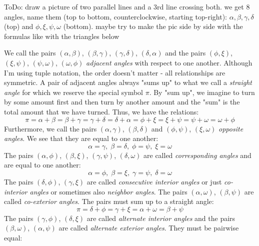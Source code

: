 \medskip
ToDo: draw a picture of two parallel lines and a 3rd line crossing both. we get 8 angles, name them (top to bottom, counterclockwise, starting top-right): $\alpha, \beta, \gamma, \delta$ (top) and $\phi, \xi, \psi, \omega$ (bottom). maybe try to make the pic side by side with the formulas like with the triangles below

\medskip
We call the pairs $(\alpha, \beta)$, $(\beta, \gamma)$, $(\gamma, \delta)$, $(\delta, \alpha)$ and the pairs $(\phi, \xi)$, $(\xi, \psi)$, $(\psi, \omega)$, $(\omega, \phi)$ \emph{adjacent angles} with respect to one another. Although I'm using tuple notation, the order doesn't matter - all relationships are symmetric. A pair of adjacent angles always "sums up" to what we call a \emph{straight angle} for which we reserve the special symbol $\pi$. By "sum up", we imagine to turn by some amount first and then turn by another amount and the "sum" is the total amount that we have turned. Thus, we have the relations:
\begin{equation}
  \pi = \alpha + \beta = \beta + \gamma = \gamma + \delta = \delta + \alpha 
      = \phi + \xi = \xi + \psi = \psi + \omega = \omega + \phi
\end{equation}
Furthermore, we call the pairs $(\alpha, \gamma)$, $(\beta, \delta)$ and $(\phi, \psi)$, $(\xi, \omega)$ \emph{opposite angles}. We see that they are equal to one another:
\begin{equation}
  \alpha = \gamma, \; \beta = \delta, \; \phi = \psi, \; \xi = \omega
\end{equation}
The pairs $(\alpha, \phi)$, $(\beta, \xi)$, $(\gamma, \psi)$, $(\delta, \omega)$ are called \emph{corresponding angles} and are equal to one another:
\begin{equation}
  \alpha = \phi, \; \beta = \xi, \; \gamma = \psi, \; \delta = \omega
\end{equation}
The pairs $(\delta, \phi)$, $(\gamma, \xi)$ are called \emph{consecutive interior angles} or just \emph{co-interior angles} or sometimes also \emph{neighbor angles}. The pairs  $(\alpha, \omega)$, $(\beta, \psi)$ are called \emph{co-exterior angles}. The pairs must sum up to a straight angle:
\begin{equation}
  \pi = \delta + \phi = \gamma + \xi = \alpha + \omega = \beta + \psi
\end{equation}
The pairs $(\gamma, \phi)$, $(\delta, \xi)$ are called \emph{alternate interior angles} and the pairs $(\beta, \omega)$, $(\alpha, \psi)$ are called \emph{alternate exterior angles}. They must be pairwise equal:
